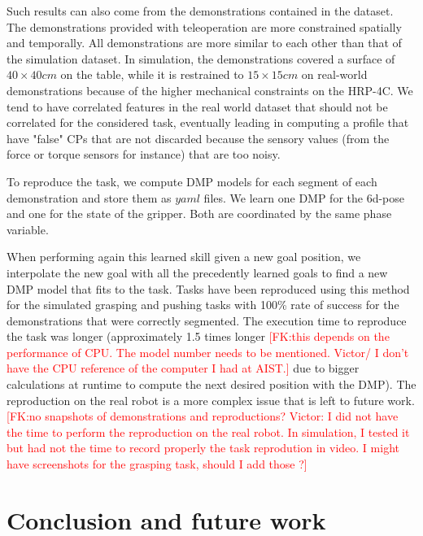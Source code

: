 \documentclass[conference]{IEEEtran}
\newcommand{\fk}[1]{\textcolor{red}{[FK:#1]}}
\begin{document}
Such results can also come from the demonstrations contained in the dataset. The demonstrations provided with teleoperation are more constrained spatially and temporally. All demonstrations are more similar to each other than that of the simulation dataset. In simulation, the demonstrations covered a surface of $40 \times 40 cm$ on the table, while it is restrained to $15 \times 15 cm$ on real-world demonstrations because of the higher mechanical constraints on the HRP-4C.  We tend to have correlated features in the real world dataset that should not be correlated for the considered task, eventually leading in computing a profile that have "false" CPs that are not discarded because the sensory values (from the force or torque sensors for instance) that are too noisy. \newline

To reproduce the task, we compute DMP models for each segment of each demonstration and store them as $yaml$ files. We learn one DMP for the 6d-pose and one for the state of the gripper. Both are coordinated by the same phase variable.

When performing again this learned skill given a new goal position, we interpolate the new goal with all the precedently learned goals to find a new DMP model that fits to the task. Tasks have been reproduced using this method for the simulated grasping and pushing tasks with 100\% rate of success for the demonstrations that were correctly segmented. The execution time to reproduce the task was longer (approximately 1.5 times longer \fk{this depends on the performance of CPU. The model number needs to be mentioned. \newline
Victor/ I don't have the CPU reference of the computer I had at AIST.} due to bigger calculations at runtime to compute the next desired position with the DMP). The reproduction on the real robot is a more complex issue that is left to future work. 
\fk{no snapshots of demonstrations and reproductions? \newline
Victor: I did not have the time to perform the reproduction on the real robot. In simulation, I tested it but had not the time to record properly the task reprodution in video. I might have screenshots for the grasping task, should I add those ?}

\section{Conclusion and future work}\label{conclusion}
\end{document}
